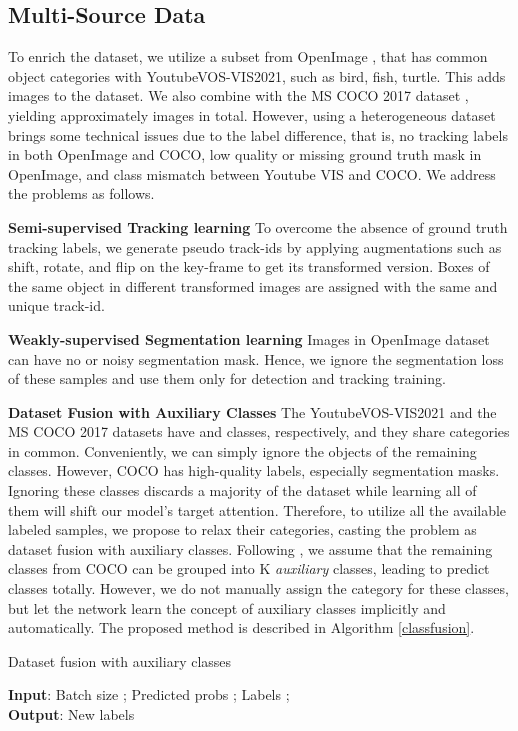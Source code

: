 \documentclass[10pt,twocolumn,letterpaper]{article}
\begin{document}
\subsection{Multi-Source Data}\label{sec:multi-source-data}
To enrich the dataset, we utilize a subset from OpenImage \cite{openimage}, that has common object categories with YoutubeVOS-VIS2021, such as bird, fish, turtle. This adds  images to the dataset. We also combine with the MS COCO 2017 dataset \cite{coco}, yielding approximately  images in total. However, using a heterogeneous dataset brings some technical issues due to the label difference, that is, no tracking labels in both OpenImage and COCO, low quality or missing ground truth mask in OpenImage, and class mismatch between Youtube VIS and COCO. We address the problems as follows.


\textbf{Semi-supervised Tracking learning} To overcome the absence of ground truth tracking labels, we generate pseudo track-ids by applying augmentations such as shift, rotate, and flip on the key-frame to get its transformed version. Boxes of the same object in different transformed images are assigned with the same and unique track-id.


\textbf{Weakly-supervised Segmentation learning} Images in OpenImage dataset can have no or noisy segmentation mask. Hence, we ignore the segmentation loss of these samples and use them only for detection and tracking training. 


\textbf{Dataset Fusion with Auxiliary Classes} The YoutubeVOS-VIS2021 and the MS COCO 2017 datasets have  and  classes, respectively, and they share  categories in common. Conveniently, we can simply ignore the objects of the remaining classes. However, COCO has high-quality labels, especially segmentation masks. Ignoring these classes discards a majority of the dataset while learning all of them will shift our model's target attention. Therefore, to utilize all the available labeled samples, we propose to relax their categories, casting the problem as dataset fusion with auxiliary classes. Following \cite{ood-plusk}, we assume that the remaining  classes from COCO can be grouped into K \textit{auxiliary} classes, leading to predict  classes totally. However, we do not manually assign the category for these  classes, but let the network learn the concept of auxiliary classes implicitly and automatically. The proposed method is described in Algorithm \ref{classfusion}. 
\begin{algorithm}[]
	\small
	\caption{Dataset fusion with auxiliary classes}
	\SetAlgoLined
	\textbf{Input}: Batch size ; Predicted probs ; Labels ; \\
	\textbf{Output}: New labels \\
	\label{classfusion}
\end{algorithm}
\end{document}
